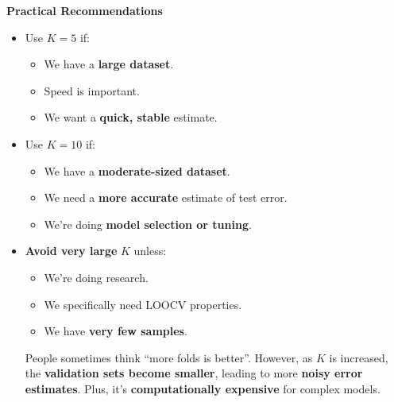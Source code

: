 \highspace
\begin{flushleft}
    \textcolor{Green3}{ \textbf{Practical Recommendations}}
\end{flushleft}
\begin{itemize}
    \item Use $K = 5$ if:
    \begin{itemize}
        \item We have a \textbf{large dataset}.
        \item Speed is important.
        \item We want a \textbf{quick, stable} estimate.
    \end{itemize}
    \item Use $K = 10$ if:
    \begin{itemize}
        \item We have a \textbf{moderate-sized dataset}.
        \item We need a \textbf{more accurate} estimate of test error.
        \item We're doing \textbf{model selection or tuning}.
    \end{itemize}
    \item \textbf{Avoid very large} $K$ unless:
    \begin{itemize}
        \item We're doing research.
        \item We specifically need LOOCV properties.
        \item We have \textbf{very few samples}.
    \end{itemize}
    People sometimes think ``more folds is better''. However, as $K$ is increased, the \textbf{validation sets become smaller}, leading to more \textbf{noisy error estimates}. Plus, it's \textbf{computationally expensive} for complex models.
\end{itemize}